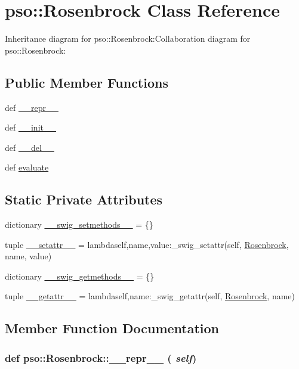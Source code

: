 \hypertarget{classpso_1_1Rosenbrock}{
\section{pso::Rosenbrock Class Reference}
\label{classpso_1_1Rosenbrock}
}
Inheritance diagram for pso::Rosenbrock:Collaboration diagram for pso::Rosenbrock:\subsection*{Public Member Functions}
\begin{CompactItemize}
\item 
def \hyperlink{classpso_1_1Rosenbrock_56aac438a1d2c22a725967ecef381344}{\_\-\_\-repr\_\-\_\-}
\item 
def \hyperlink{classpso_1_1Rosenbrock_10f77ae0f5c18274477e3102632b24f1}{\_\-\_\-init\_\-\_\-}
\item 
def \hyperlink{classpso_1_1Rosenbrock_424c4c5cda5831c268442b97ea667618}{\_\-\_\-del\_\-\_\-}
\item 
def \hyperlink{classpso_1_1Rosenbrock_8609c7b4f2ca951920cfee0cb6fdacc4}{evaluate}
\end{CompactItemize}
\subsection*{Static Private Attributes}
\begin{CompactItemize}
\item 
dictionary \hyperlink{classpso_1_1Rosenbrock_7b19f06e4baa11a3daf3c6faccdb7241}{\_\-\_\-swig\_\-setmethods\_\-\_\-} = \{\}
\item 
tuple \hyperlink{classpso_1_1Rosenbrock_20daa93c52410a96f8e6affaaed83d36}{\_\-\_\-setattr\_\-\_\-} = lambdaself,name,value:\_\-swig\_\-setattr(self, \hyperlink{classpso_1_1Rosenbrock}{Rosenbrock}, name, value)
\item 
dictionary \hyperlink{classpso_1_1Rosenbrock_5228ee78176ce890dca261f8e0b5b20a}{\_\-\_\-swig\_\-getmethods\_\-\_\-} = \{\}
\item 
tuple \hyperlink{classpso_1_1Rosenbrock_c987569b39c7919e9c720d040904a4c4}{\_\-\_\-getattr\_\-\_\-} = lambdaself,name:\_\-swig\_\-getattr(self, \hyperlink{classpso_1_1Rosenbrock}{Rosenbrock}, name)
\end{CompactItemize}


\subsection{Member Function Documentation}
\hypertarget{classpso_1_1Rosenbrock_56aac438a1d2c22a725967ecef381344}{
\subsubsection{\setlength{\rightskip}{0pt plus 5cm}def pso::Rosenbrock::\_\-\_\-repr\_\-\_\- ( {\em self})}}
\label{classpso_1_1Rosenbrock_56aac438a1d2c22a725967ecef381344}




